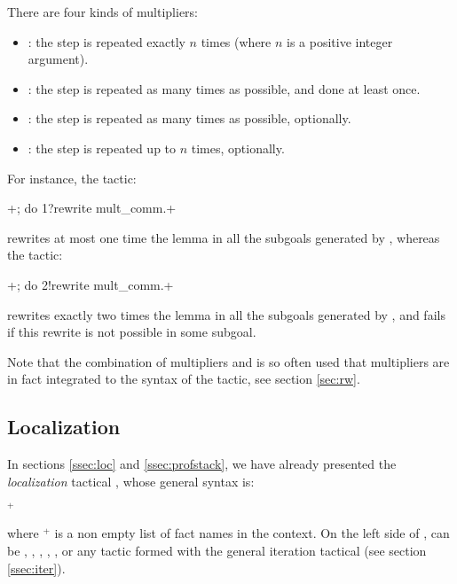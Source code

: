 There are four kinds of multipliers:
  \begin{itemize}
  \item {}: the step {\tac} is repeated exactly $n$ times
    (where $n$ is a positive integer argument).
  \item \ssrC{!}: the step {\tac} is repeated as many times as possible,
    and done at least once.
  \item {}: the step {\tac} is repeated as many times as possible,
    optionally.
  \item {}: the step {\tac} is repeated up to $n$ times,
    optionally.
  \end{itemize}

For instance, the tactic:

\begin{center}
 {\tac} \ssrL+; do 1?rewrite mult_comm.+
\end{center}

rewrites at most one time the lemma  in all the subgoals
generated by {\tac} , whereas the tactic:

\begin{center}
  {\tac} \ssrL+; do 2!rewrite mult_comm.+
\end{center}

rewrites exactly two times the lemma  in all the subgoals
generated by {\tac}, and fails if this rewrite is not possible
in some subgoal.

Note that the combination of multipliers and  is so often
used that multipliers are in fact integrated to the syntax of the \ssr{}
 tactic, see section \ref{sec:rw}.

\subsection{Localization}\label{ssec:gloc}

In sections \ref{ssec:loc} and \ref{ssec:profstack}, we have already
presented the \emph{localization} tactical , whose general
syntax is:
\begin{center}
	{\tac}  $^+$ \optional{\ssrC{*}}
\end{center}

where $^+$ is a non empty list of fact
names in the context. On the left side of , {\tac} can be
, , , , ,
 or any tactic formed with the general iteration tactical  (see
 section \ref{ssec:iter}).

